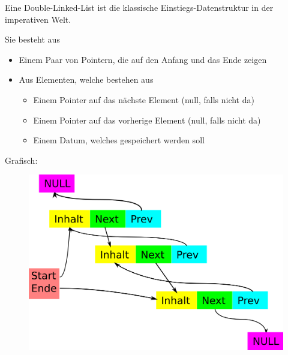 \documentclass{beamer}
\begin{document}
\begin{frame}
Eine Double-Linked-List ist die klassische Einstiegs-Datenstruktur in der imperativen Welt.\\\par \pause
Sie besteht aus
\begin{itemize}
 \item Einem Paar von Pointern, die auf den Anfang und das Ende zeigen
 \pause
 \item Aus Elementen, welche bestehen aus
 \pause
 \begin{itemize}
  \item Einem Pointer auf das nächste Element (null, falls nicht da)
  \pause
  \item Einem Pointer auf das vorherige Element (null, falls nicht da)
  \pause
  \item Einem Datum, welches gespeichert werden soll
 \end{itemize}

\end{itemize}

\end{frame}

\begin{frame}
Grafisch:
\begin{figure}[h]
\includegraphics{dll.png}
\end{figure}

\end{frame}
\end{document}

